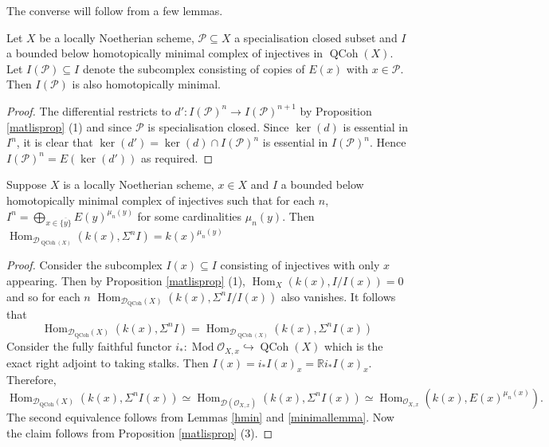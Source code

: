 \documentclass[12pt,oneside]{amsart}
\DeclareMathOperator{\Hom}{Hom}
\DeclareMathOperator{\Mod}{Mod}
\DeclareMathOperator{\QCoh}{QCoh}
\begin{document}
The converse will follow from a few lemmas.

\begin{lemma} \label{hmin}
Let $X$ be a locally Noetherian scheme,  $\mathcal{P} \subseteq X$ a specialisation closed subset and $I$ a bounded below homotopically minimal complex of injectives in $\QCoh(X)$. Let $I(\mathcal{P}) \subseteq I$ denote the subcomplex consisting of copies of $E(x)$ with $x \in \mathcal{P}$. Then $I(\mathcal{P})$ is also homotopically minimal. 
\end{lemma}

\begin{proof}
The differential restricts to $d': I(\mathcal{P})^n \to I(\mathcal{P})^{n+1}$ by Proposition \ref{matlisprop} (1) and since $\mathcal{P}$ is specialisation closed. Since $\ker(d)$ is essential in $I^n$, it is clear that $\ker(d') = \ker(d) \cap I(\mathcal{P})^n$ is essential in $I(\mathcal{P})^n$. Hence $I(\mathcal{P})^n = E(\ker(d'))$ as required. 
\end{proof}


\begin{lemma} \label{basslemma}
Suppose $X$ is a locally Noetherian scheme, $x \in X$ and $I$ a bounded below homotopically minimal complex of injectives such that for each $n$, $I^n = \bigoplus_{x \in \overline{\{y\}}} E(y)^{\mu_n(y)}$ for some cardinalities $\mu_n(y)$. Then $\Hom_{\mathcal{D}_{\QCoh(X)}}(k(x), \Sigma^n I) = k(x)^{\mu_n(y)}$ 
\end{lemma}

\begin{proof}
Consider the subcomplex $I(x) \subseteq I$ consisting of injectives with only $x$ appearing. Then by Proposition \ref{matlisprop} (1), $\Hom_X(k(x),I/I(x)) = 0$ and so  for each $n$ $\Hom_{\mathcal{D}_{\QCoh}(X)}(k(x),\Sigma^n I/I(x))$ also vanishes. It follows that 
\[
\Hom_{\mathcal{D}_{\QCoh}(X)}(k(x), \Sigma^n I) = \Hom_{\mathcal{D}_{\QCoh(X)}}(k(x),\Sigma^n I(x)) 
\]
Consider the fully faithful functor $i_\ast: \Mod \mathcal{O}_{X,x} \hookrightarrow \QCoh(X)$ which is the exact right adjoint to taking stalks. Then $I(x) = i_\ast I(x)_x = \mathbb{R} i_\ast I(x)_x$. Therefore,
\[
\Hom_{\mathcal{D}_{\QCoh}(X)}(k(x),\Sigma^n I(x)) \simeq \Hom_{\mathcal{D}(\mathcal{O}_{X,x})}(k(x),\Sigma^n I(x)) \simeq \Hom_{\mathcal{O}_{X,x}}(k(x), E(x)^{\mu_n(x)}).
\]
The second equivalence follows from Lemmas \ref{hmin} and \ref{minimallemma}. Now the claim follows from Proposition \ref{matlisprop} (3).
\end{proof}
\end{document}
